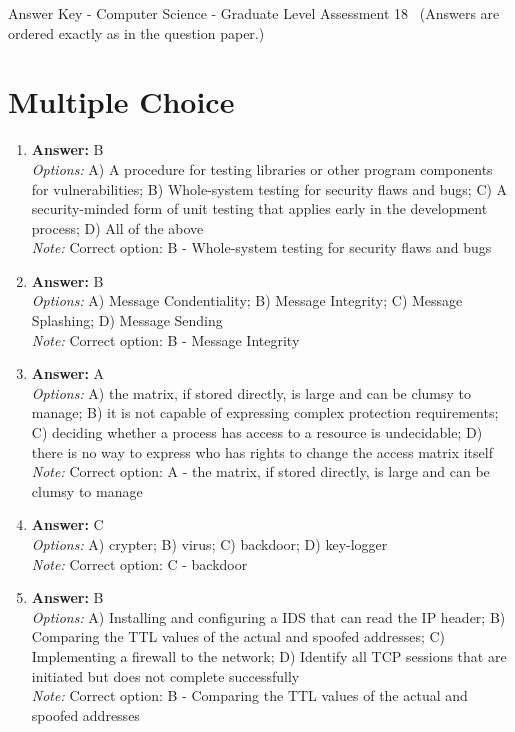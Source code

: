 \documentclass[12pt]{article}
\begin{document}
\begin{center}
Answer Key - Computer Science - Graduate Level Assessment 18 \
\small (Answers are ordered exactly as in the question paper.)
\end{center}

\section*{Multiple Choice}
\begin{enumerate}[label=\arabic*.]
\item \textbf{Answer:} B
\\ \textit{Options:} A) A procedure for testing libraries or other program components for vulnerabilities; B) Whole-system testing for security flaws and bugs; C) A security-minded form of unit testing that applies early in the development process; D) All of the above
\\ \textit{Note:} Correct option: B - Whole-system testing for security flaws and bugs
\item \textbf{Answer:} B
\\ \textit{Options:} A) Message Condentiality; B) Message Integrity; C) Message Splashing; D) Message Sending
\\ \textit{Note:} Correct option: B - Message Integrity
\item \textbf{Answer:} A
\\ \textit{Options:} A) the matrix, if stored directly, is large and can be clumsy to manage; B) it is not capable of expressing complex protection requirements; C) deciding whether a process has access to a resource is undecidable; D) there is no way to express who has rights to change the access matrix itself
\\ \textit{Note:} Correct option: A - the matrix, if stored directly, is large and can be clumsy to manage
\item \textbf{Answer:} C
\\ \textit{Options:} A) crypter; B) virus; C) backdoor; D) key-logger
\\ \textit{Note:} Correct option: C - backdoor
\item \textbf{Answer:} B
\\ \textit{Options:} A) Installing and configuring a IDS that can read the IP header; B) Comparing the TTL values of the actual and spoofed addresses; C) Implementing a firewall to the network; D) Identify all TCP sessions that are initiated but does not complete successfully
\\ \textit{Note:} Correct option: B - Comparing the TTL values of the actual and spoofed addresses
\end{enumerate}
\end{document}
